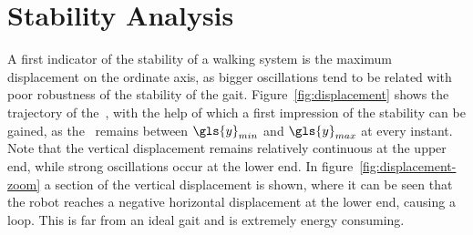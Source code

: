 
\section{Stability Analysis}

A first indicator of the stability of a walking system is the maximum displacement on the ordinate axis, as bigger oscillations tend to be related with poor robustness of the stability of the gait. Figure~\ref{fig:displacement} shows the trajectory of the~, with the help of which a first impression of the stability can be gained, as the~ remains between $\gls{y}_{min}$ and $\gls{y}_{max}$ at every instant. Note that the vertical displacement remains relatively continuous at the upper end, while strong oscillations occur at the lower end. In figure~\ref{fig:displacement-zoom} a section of the vertical displacement is shown, where it can be seen that the robot reaches a negative horizontal displacement at the lower end, causing a loop. This is far from an ideal gait and is extremely energy consuming. \\

